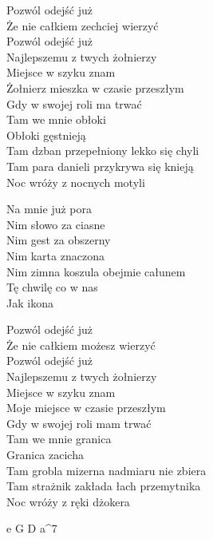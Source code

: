 \begin{text}
    Pozwól odejść już\\
    Że nie całkiem zechciej wierzyć\\
    Pozwól odejść już\\
    Najlepszemu z twych żołnierzy\\
    Miejsce w szyku znam\\
    Żołnierz mieszka w czasie przeszłym\\
    Gdy w swojej roli ma trwać\\
    Tam we mnie obłoki\\
    Obłoki gęstnieją\\
    Tam dzban przepełniony lekko się chyli\\
    Tam para danieli przykrywa się knieją\\
    Noc wróży z nocnych motyli

    \vin Na mnie już pora\\
    \vin Nim słowo za ciasne\\
    \vin Nim gest za obszerny\\
    \vin Nim karta znaczona\\
    \vin Nim zimna koszula obejmie całunem\\
    \vin Tę chwilę co w nas\\
    \vin Jak ikona

    Pozwól odejść już\\
    Że nie całkiem możesz wierzyć\\
    Pozwól odejść już\\
    Najlepszemu z twych żołnierzy\\
    Miejsce w szyku znam\\
    Moje miejsce w czasie przeszłym\\
    Gdy w swojej roli mam trwać\\
    Tam we mnie granica\\
    Granica zacicha\\
    Tam grobla mizerna nadmiaru nie zbiera\\
    Tam strażnik zakłada łach przemytnika\\
    Noc wróży z ręki dżokera
\end{text}
\begin{chord}
    e G D a^7
\end{chord}